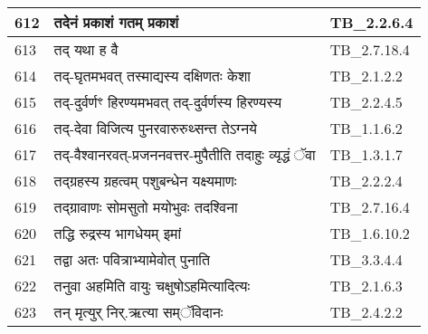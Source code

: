 \documentclass[17pt]{extarticle}
\begin{document}
\begin{longtable}{||p{0.4in}||p{4.9in}||p{0.9in}||}
    612 & तदेनं प्रकाशं गतम् प्रकाशं & TB\_2.2.6.4       \\
    
    \hline
        
    613 & तद् यथा ह वै & TB\_2.7.18.4       \\
    
    \hline
        
    614 & तद्{-}घृतमभवत् तस्माद्यस्य दक्षिणतः केशा & TB\_2.1.2.2       \\
    
    \hline
        
    615 & तद्{-}दुर्वर्णꣳ हिरण्यमभवत् तद्{-}दुर्वर्णस्य हिरण्यस्य & TB\_2.2.4.5       \\
    
    \hline
        
    616 & तद्{-}देवा विजित्य पुनरवारुरुथ्सन्त तेऽग्नये & TB\_1.1.6.2       \\
    
    \hline
        
    617 & तद्{-}वैश्वानरवत्{-}प्रजननवत्तर{-}मुपैतीति तदाहुः व्यृद्धं ॅवा & TB\_1.3.1.7       \\
    
    \hline
        
    618 & तद्ग्रहस्य ग्रहत्वम् पशुबन्धेन यक्ष्यमाणः & TB\_2.2.2.4       \\
    
    \hline
        
    619 & तद्ग्रावाणः सोमसुतो मयोभुवः तदश्विना & TB\_2.7.16.4       \\
    
    \hline
        
    620 & तद्धि रुद्रस्य भागधेयम् इमां & TB\_1.6.10.2       \\
    
    \hline
        
    621 & तद्वा अतः पवित्राभ्यामेवोत् पुनाति & TB\_3.3.4.4       \\
    
    \hline
        
    622 & तनुवा अहमिति वायुः चक्षुषोऽहमित्यादित्यः & TB\_2.1.6.3       \\
    
    \hline
        
    623 & तन् मृत्युर् निर्.ऋत्या सम्ॅविदानः & TB\_2.4.2.2       \\
    
    \hline
        

\end{longtable}
\end{document}
